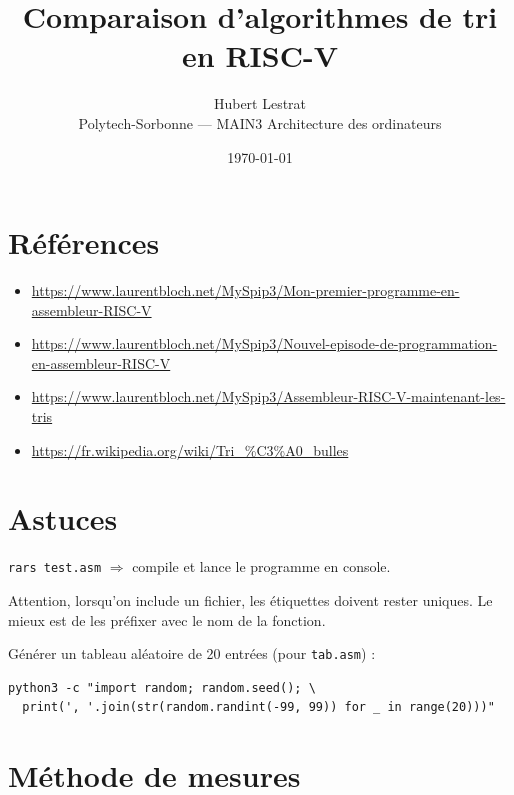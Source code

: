 \documentclass[11pt,a4paper]{article}
\title{Comparaison d'algorithmes de tri en RISC-V}
\author{Hubert Lestrat \\ \small Polytech-Sorbonne --- MAIN3 Architecture des ordinateurs}
\date{\today}
\begin{document}
\maketitle
\tableofcontents
\vspace{1em}

\section{Références}

\begin{itemize}
    \item \url{https://www.laurentbloch.net/MySpip3/Mon-premier-programme-en-assembleur-RISC-V}
    \item \url{https://www.laurentbloch.net/MySpip3/Nouvel-episode-de-programmation-en-assembleur-RISC-V}
    \item \url{https://www.laurentbloch.net/MySpip3/Assembleur-RISC-V-maintenant-les-tris}
    \item \url{https://fr.wikipedia.org/wiki/Tri_\%C3\%A0_bulles}
\end{itemize}

\section{Astuces}

\texttt{rars test.asm} $\Rightarrow$ compile et lance le programme en console.

Attention, lorsqu'on \guillemotleft{} include \guillemotright{} un fichier, les étiquettes doivent rester uniques. Le mieux est de les préfixer avec le nom de la fonction.

Générer un tableau aléatoire de 20 entrées (pour \texttt{tab.asm}) :

\begin{lstlisting}[style=bash]
python3 -c "import random; random.seed(); \
  print(', '.join(str(random.randint(-99, 99)) for _ in range(20)))"
\end{lstlisting}

\section{Méthode de mesures}
\end{document}

